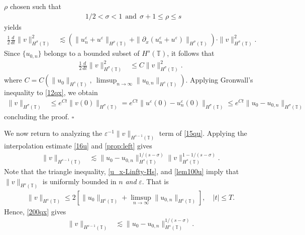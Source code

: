 \documentclass[12pt,reqno]{amsart}
\renewcommand{\qedsymbol}{\ensuremath{\square}}
\newcommand{\p}{\partial}
\newcommand{\ci}{\mathbb{T}}
\newcommand{\ee}{\varepsilon}
\theoremstyle{plain}  %
\theoremstyle{definition}
\begin{document}
$\rho$ chosen such that
%
%
\begin{equation}
\label{size_of_sigma'}
\begin{split}
	& 1/2 < \sigma < 1 \ \ \text{and} \ \  \sigma + 1 \le \rho \le s
\end{split}
\end{equation}
%
%
yields
%
%
\begin{equation*}
\begin{split}
\frac{1}{2}\frac{d}{dt} \|v\|_{H^\sigma(\ci)}^2
& \lesssim
(\|u^{\ee}_n + u^\ee \|_{H^{\rho}(\ci)} +
\|\p_x(u^{\ee}_n + u^\ee) \|_{H^\sigma(\ci)})
\cdot \|v\|_{H^\sigma(\ci)}^2.
\end{split}
\end{equation*}
%
%
Since $\{u_{0,n}\}$ belongs to a bounded subset of $H^s(\ci)$, it follows that %
%
\begin{equation}
\begin{split}
\label{12qx}
\frac{1}{2}\frac{d}{dt} \|v\|_{H^{\sigma}(\ci)}^2
& \le
C \|v\|_{H^{\sigma}(\ci)}^2.
\end{split}
\end{equation}
%
%
where $C = C(\|u_0\|_{H^s(\ci)}, \ \limsup_{n \to \infty} 
\|u_{0,n}\|_{H^s(\ci)})$. 
Applying Gronwall's inequality to \eqref{12qx}, we obtain
%
%
\begin{equation*}
\begin{split}
\|v\|_{H^{\sigma}(\ci)}
& \le e^{C t}\|v(0)\|_{H^{\sigma}(\ci)}
= e^{C t}\|u^\ee(0) - u^\ee_n(0) \|_{H^{\sigma}(\ci)} \le e^{C t} \|u_0 - 
u_{0,n}\|_{H^\sigma(\ci)}
\end{split}
\end{equation*}
%
%
concluding the proof. \qquad \qedsymbol
%
%
%

We now return to analyzing the $\ee^{-1}
\|v\|_{H^{s-1}(\ci)}$ term of \eqref{15qu}.
Applying the 
interpolation estimate \eqref{16u} and
\autoref{prop:left} gives
%
%
%
%
\begin{equation}
\begin{split}
\label{200qx}
\|v\|_{H^{s-1}(\ci)} 
& \lesssim  
\|u_0-u_{0,n}\|_{H^s(\ci)}^{1/(s-\sigma)}\|v\|_{H^s(\ci)}^{1- 
1/(s-\sigma)}.
\end{split}
\end{equation}
%
%
%
Note that the triangle inequality, \eqref{u_x-Linfty-Hs},
and \eqref{lem100u} 
imply that $\|v\|_{H^s(\ci)}$ is uniformly bounded in $n$ \emph{and} $\ee$. 
That is
%
%
\begin{equation*}
\begin{split}
	\|v\|_{H^s(\ci)} \le 2 \left[ \|u_0 \|_{H^s(\ci)} + \limsup_{n \to 
	\infty} 
	\|u_{0,n}\|_{H^s(\ci)} 
\right], \quad |t| \le T.
\label{growth_v}
\end{split}
\end{equation*}
%
%
Hence, \eqref{200qx} gives
%
%
\begin{equation}
\begin{split}
\label{200qxr}
\|v\|_{H^{s-1}(\ci)} 
& \lesssim  
\|u_0-u_{0,n}\|_{H^s(\ci)}^{1/(s-\sigma)}.
\end{split}
\end{equation}
\end{document}
